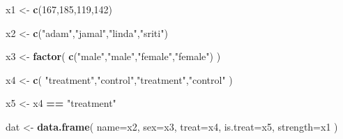\documentclass[]{book}
\newenvironment{Shaded}{\begin{snugshade}}{\end{snugshade}}
\newcommand{\DataTypeTok}[1]{\textcolor[rgb]{0.13,0.29,0.53}{#1}}
\newcommand{\DecValTok}[1]{\textcolor[rgb]{0.00,0.00,0.81}{#1}}
\newcommand{\KeywordTok}[1]{\textcolor[rgb]{0.13,0.29,0.53}{\textbf{#1}}}
\newcommand{\NormalTok}[1]{#1}
\newcommand{\OperatorTok}[1]{\textcolor[rgb]{0.81,0.36,0.00}{\textbf{#1}}}
\newcommand{\StringTok}[1]{\textcolor[rgb]{0.31,0.60,0.02}{#1}}
\theoremstyle{definition}
\theoremstyle{definition}
\theoremstyle{definition}
\theoremstyle{remark}
\begin{document}
\begin{Shaded}
\begin{Highlighting}[]

\NormalTok{x1 <-}\StringTok{ }\KeywordTok{c}\NormalTok{(}\DecValTok{167}\NormalTok{,}\DecValTok{185}\NormalTok{,}\DecValTok{119}\NormalTok{,}\DecValTok{142}\NormalTok{)}

\NormalTok{x2 <-}\StringTok{ }\KeywordTok{c}\NormalTok{(}\StringTok{"adam"}\NormalTok{,}\StringTok{"jamal"}\NormalTok{,}\StringTok{"linda"}\NormalTok{,}\StringTok{"sriti"}\NormalTok{)}

\NormalTok{x3 <-}\StringTok{ }\KeywordTok{factor}\NormalTok{( }\KeywordTok{c}\NormalTok{(}\StringTok{"male"}\NormalTok{,}\StringTok{"male"}\NormalTok{,}\StringTok{"female"}\NormalTok{,}\StringTok{"female"}\NormalTok{) )}

\NormalTok{x4 <-}\StringTok{ }\KeywordTok{c}\NormalTok{( }\StringTok{"treatment"}\NormalTok{,}\StringTok{"control"}\NormalTok{,}\StringTok{"treatment"}\NormalTok{,}\StringTok{"control"}\NormalTok{ )}

\NormalTok{x5 <-}\StringTok{ }\NormalTok{x4 }\OperatorTok{==}\StringTok{ "treatment"}

\NormalTok{dat <-}\StringTok{ }\KeywordTok{data.frame}\NormalTok{( }\DataTypeTok{name=}\NormalTok{x2, }\DataTypeTok{sex=}\NormalTok{x3, }\DataTypeTok{treat=}\NormalTok{x4, }\DataTypeTok{is.treat=}\NormalTok{x5, }\DataTypeTok{strength=}\NormalTok{x1 )}
\end{Highlighting}
\end{Shaded}
\end{document}
